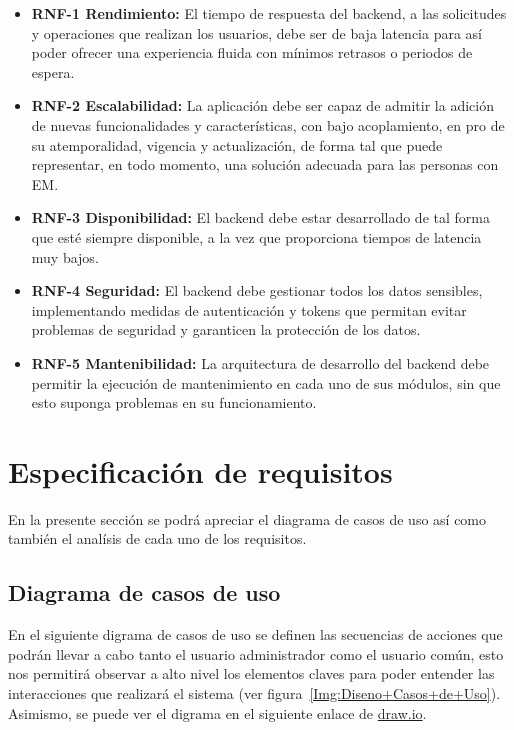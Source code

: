 \begin{itemize}
\tightlist
\item
  \textbf{RNF-1 Rendimiento:} El tiempo de respuesta del backend, a las solicitudes y operaciones que realizan los usuarios, debe ser de baja latencia para así poder ofrecer una experiencia fluida con mínimos retrasos o periodos de espera.\\
\item
  \textbf{RNF-2 Escalabilidad:} La aplicación debe ser capaz de admitir la adición de nuevas funcionalidades y características, con bajo acoplamiento, en pro de su atemporalidad, vigencia y actualización, de forma tal que puede representar, en todo momento, una solución adecuada para las personas con EM.\\
\item
  \textbf{RNF-3 Disponibilidad:} El backend debe estar desarrollado de tal forma que esté siempre disponible, a la vez que proporciona tiempos de latencia muy bajos.\\
\item
  \textbf{RNF-4 Seguridad:} El backend debe gestionar todos los datos sensibles, implementando medidas de autenticación y tokens que permitan evitar problemas de seguridad y garanticen la protección de los datos.\\
\item
  \textbf{RNF-5 Mantenibilidad:} La arquitectura de desarrollo del backend debe permitir la ejecución de mantenimiento en cada uno de sus módulos, sin que esto suponga problemas en su funcionamiento.\\
\end{itemize}

\section{Especificación de requisitos}\label{especificacion-de-requisitos-1}
En la presente sección se podrá apreciar el diagrama de casos de uso así como también el analísis de cada uno de los requisitos.

\subsection{Diagrama de casos de uso}
En el siguiente digrama de casos de uso se definen las secuencias de acciones que podrán llevar a cabo tanto el usuario administrador como el usuario común, esto nos permitirá observar a alto nivel los elementos claves para poder entender las interacciones que realizará el sistema (ver figura~\ref{Img:Diseno+Casos+de+Uso}).
Asimismo, se puede ver el digrama en el siguiente enlace de \href{https://drive.google.com/file/d/1eJbkHryF-Qa5LxR3RD6JjWvqmUafC0Qa/view?usp=sharing}{draw.io}.

